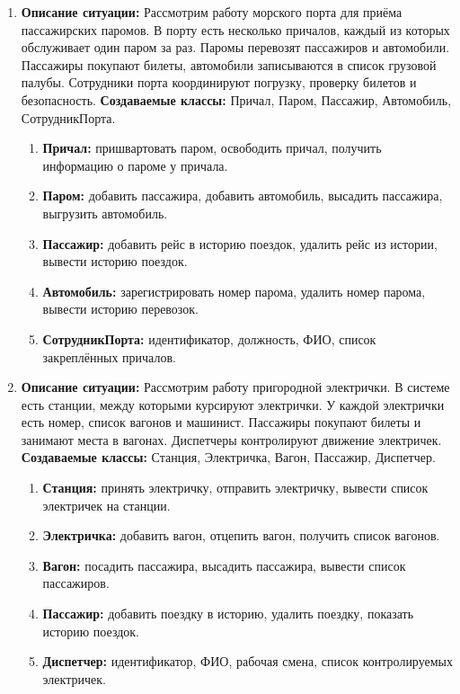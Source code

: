 \begin{enumerate}
\item
\textbf{Описание ситуации:}
Рассмотрим работу морского порта для приёма пассажирских паромов. 
В порту есть несколько причалов, каждый из которых обслуживает один паром за раз. 
Паромы перевозят пассажиров и автомобили. 
Пассажиры покупают билеты, автомобили записываются в список грузовой палубы. 
Сотрудники порта координируют погрузку, проверку билетов и безопасность.
\textbf{Создаваемые классы:} Причал, Паром, Пассажир, Автомобиль, СотрудникПорта.
\begin{enumerate}
    \item \textbf{Причал:} пришвартовать паром, освободить причал, получить информацию о пароме у причала.
    \item \textbf{Паром:} добавить пассажира, добавить автомобиль, высадить пассажира, выгрузить автомобиль.
    \item \textbf{Пассажир:} добавить рейс в историю поездок, удалить рейс из истории, 
    вывести историю поездок.
    \item \textbf{Автомобиль:} зарегистрировать номер парома, удалить номер парома, вывести историю перевозок.
    \item \textbf{СотрудникПорта:} идентификатор, должность, ФИО, список закреплённых причалов.
\end{enumerate}

\item
\textbf{Описание ситуации:}
Рассмотрим работу пригородной электрички. В системе есть станции, 
между которыми курсируют электрички. У каждой электрички есть номер, 
список вагонов и машинист. Пассажиры покупают билеты и 
занимают места в вагонах. Диспетчеры контролируют движение электричек.
\textbf{Создаваемые классы:} Станция, Электричка, Вагон, Пассажир, Диспетчер.
\begin{enumerate}
    \item \textbf{Станция:} принять электричку, отправить электричку, вывести список электричек на станции.
    \item \textbf{Электричка:} добавить вагон, отцепить вагон, получить список вагонов.
    \item \textbf{Вагон:} посадить пассажира, высадить пассажира, вывести список пассажиров.
    \item \textbf{Пассажир:} добавить поездку в историю, удалить поездку, показать историю поездок.
    \item \textbf{Диспетчер:} идентификатор, ФИО, рабочая смена, список контролируемых электричек.
\end{enumerate}


\end{enumerate}
